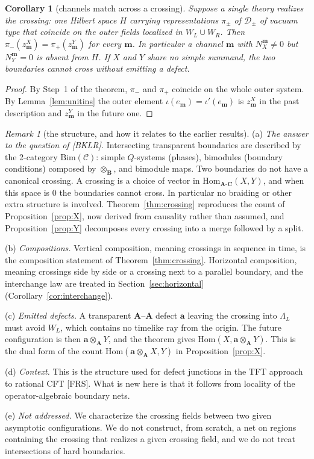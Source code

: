 \documentclass[11pt]{article}
\newtheorem{corollary}[theorem]{Corollary}
\theoremstyle{definition}
\theoremstyle{remark}
\newtheorem{remark}[theorem]{Remark}
\newcommand{\bfB}{\mathbf B}
\newcommand{\bfA}{\mathbf A}
\newcommand{\bfC}{\mathbf C}
\begin{document}
\begin{corollary}[channels match across a crossing]\label{cor:channels}
Suppose a single theory realizes the crossing: one Hilbert space $H$ carrying representations $\pi_\pm$ of $\mathcal D_\pm$ of vacuum type that coincide on the outer fields localized in $W_L\cup W_R$. Then $\pi_-(z^X_{\mathbf m})=\pi_+(z^Y_{\mathbf m})$ for every $\mathbf m$. In particular a channel $\mathbf m$ with $N^{\mathbf m}_X\neq0$ but $N^{\mathbf m}_Y=0$ is absent from $H$. If $X$ and $Y$ share no simple summand, the two boundaries cannot cross without emitting a defect.
\end{corollary}
\begin{proof}
By Step~1 of the theorem, $\pi_-$ and $\pi_+$ coincide on the whole outer system. By Lemma~\ref{lem:unitins} the outer element $\iota(e_{\mathbf m})=\iota'(e_{\mathbf m})$ is $z^X_{\mathbf m}$ in the past description and $z^Y_{\mathbf m}$ in the future one.
\end{proof}

\begin{remark}[the structure, and how it relates to the earlier results]\label{rem:2cat}
(a) \emph{The answer to the question of [BKLR].} Intersecting transparent boundaries are described by the 2-category $\mathrm{Bim}(\mathcal C)$: simple $Q$-systems (phases), bimodules (boundary conditions) composed by $\otimes_{\bfB}$, and bimodule maps. Two boundaries do not have a canonical crossing. A crossing is a choice of vector in $\mathrm{Hom}_{\bfA\text{-}\bfC}(X,Y)$, and when this space is $0$ the boundaries cannot cross. In particular no braiding or other extra structure is involved. Theorem~\ref{thm:crossing} reproduces the count of Proposition~\ref{prop:X}, now derived from causality rather than assumed, and Proposition~\ref{prop:Y} decomposes every crossing into a merge followed by a split.

(b) \emph{Compositions.} Vertical composition, meaning crossings in sequence in time, is the composition statement of Theorem~\ref{thm:crossing}. Horizontal composition, meaning crossings side by side or a crossing next to a parallel boundary, and the interchange law are treated in Section~\ref{sec:horizontal} (Corollary~\ref{cor:interchange}).

(c) \emph{Emitted defects.} A transparent $\bfA$--$\bfA$ defect $\mathbf a$ leaving the crossing into $\Lambda_L$ must avoid $W_L$, which contains no timelike ray from the origin. The future configuration is then $\mathbf a\otimes_{\bfA}Y$, and the theorem gives $\mathrm{Hom}(X,\mathbf a\otimes_{\bfA}Y)$. This is the dual form of the count $\mathrm{Hom}(\mathbf a\otimes_{\bfA}X,Y)$ in Proposition~\ref{prop:X}.

(d) \emph{Context.} This is the structure used for defect junctions in the TFT approach to rational CFT [FRS]. What is new here is that it follows from locality of the operator-algebraic boundary nets.

(e) \emph{Not addressed.} We characterize the crossing fields between two given asymptotic configurations. We do not construct, from scratch, a net on regions containing the crossing that realizes a given crossing field, and we do not treat intersections of hard boundaries.
\end{remark}
\end{document}
